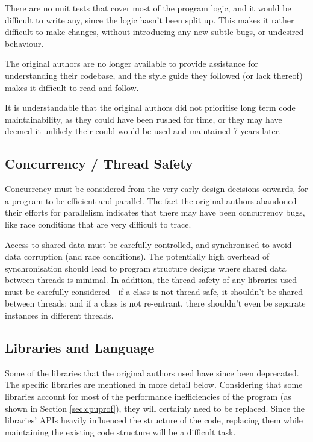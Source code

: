There are no unit tests that cover most of the program logic, and it would be difficult to write any, since the logic hasn't been split up. This makes it rather difficult to make changes, without introducing any new subtle bugs, or undesired behaviour.

The original authors are no longer available to provide assistance for understanding their codebase, and the style guide they followed (or lack thereof) makes it difficult to read and follow.

It is understandable that the original authors did not prioritise long term code maintainability, as they could have been rushed for time, or they may have deemed it unlikely their could would be used and maintained 7 years later.

\subsection{Concurrency / Thread Safety}

Concurrency must be considered from the very early design decisions onwards, for a program to be efficient and parallel. The fact the original authors abandoned their efforts for parallelism indicates that there may have been concurrency bugs, like race conditions \autocite{raceconditions} that are very difficult to trace.

Access to shared data must be carefully controlled, and synchronised to avoid data corruption (and race conditions). The potentially high overhead of synchronisation should lead to program structure designs where shared data between threads is minimal. In addition, the thread safety of any libraries used must be carefully considered - if a class is not thread safe, it shouldn't be shared  between threads; and if a class is not re-entrant, there shouldn't even be separate instances in different threads.

\subsection{Libraries and Language}
\label{sec:libs}
Some of the libraries that the original authors used have since been deprecated. The specific libraries are mentioned in more detail below. Considering that some libraries account for most of the performance inefficiencies of the program (as shown in Section \ref{sec:cpuprof}), they will certainly need to be replaced. Since the libraries' APIs heavily influenced the structure of the code, replacing them while maintaining the existing code structure will be a difficult task.

